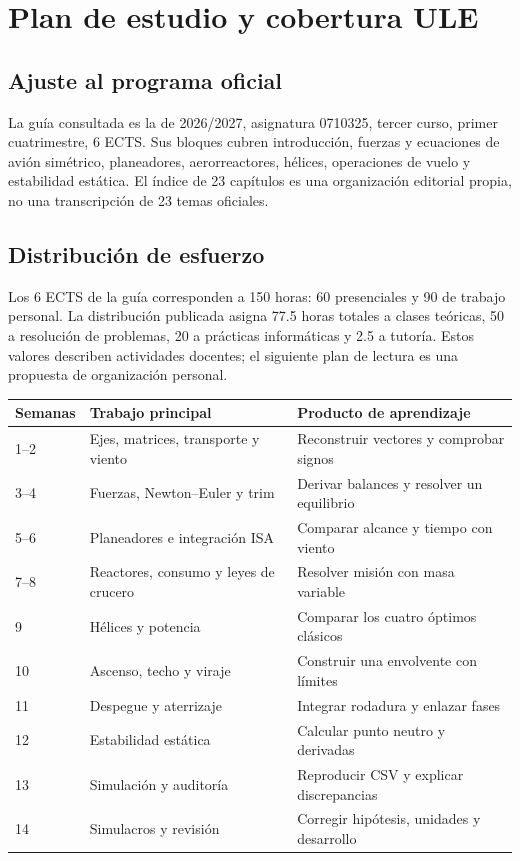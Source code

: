 \chapter{Plan de estudio y cobertura ULE}\label{app:study}
\section{Ajuste al programa oficial}
La guía consultada es la de 2026/2027, asignatura 0710325, tercer curso, primer cuatrimestre, 6 ECTS. Sus bloques cubren introducción, fuerzas y ecuaciones de avión simétrico, planeadores, aerorreactores, hélices, operaciones de vuelo y estabilidad estática. El índice de 23 capítulos es una organización editorial propia, no una transcripción de 23 temas oficiales.



\clearpage
\section{Distribución de esfuerzo}
Los 6 ECTS de la guía corresponden a 150 horas: 60 presenciales y 90 de trabajo personal. La distribución publicada asigna 77.5 horas totales a clases teóricas, 50 a resolución de problemas, 20 a prácticas informáticas y 2.5 a tutoría. Estos valores describen actividades docentes; el siguiente plan de lectura es una propuesta de organización personal.

\begin{longtable}{p{.12\linewidth}p{.48\linewidth}p{.28\linewidth}}\toprule
Semanas&Trabajo principal&Producto de aprendizaje\\\midrule\endhead
1--2&Ejes, matrices, transporte y viento&Reconstruir vectores y comprobar signos\\
3--4&Fuerzas, Newton--Euler y trim&Derivar balances y resolver un equilibrio\\
5--6&Planeadores e integración ISA&Comparar alcance y tiempo con viento\\
7--8&Reactores, consumo y leyes de crucero&Resolver misión con masa variable\\
9&Hélices y potencia&Comparar los cuatro óptimos clásicos\\
10&Ascenso, techo y viraje&Construir una envolvente con límites\\
11&Despegue y aterrizaje&Integrar rodadura y enlazar fases\\
12&Estabilidad estática&Calcular punto neutro y derivadas\\
13&Simulación y auditoría&Reproducir CSV y explicar discrepancias\\
14&Simulacros y revisión&Corregir hipótesis, unidades y desarrollo\\\bottomrule
\end{longtable}

